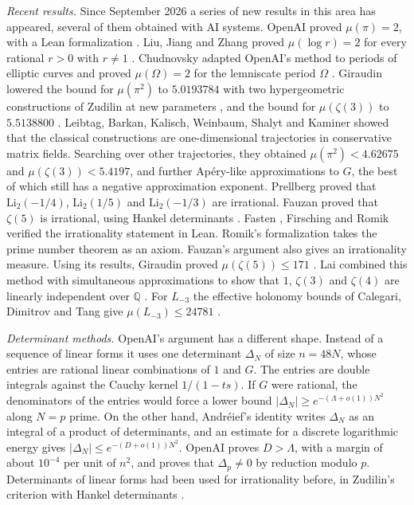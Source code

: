 \documentclass[11pt]{amsart}
\theoremstyle{definition}
\theoremstyle{remark}
\numberwithin{equation}{section}
\newcommand{\Q}{\mathbb Q}
\begin{document}
\emph{Recent results.} Since September 2026 a series of new results in this area has appeared, several of
them obtained with AI systems. OpenAI proved $\mu(\pi)=2$, with a Lean formalization \cite{OpenAIPi2026}.
Liu, Jiang and Zhang proved $\mu(\log r)=2$ for every rational $r>0$ with $r\ne1$ \cite{LiuJiangZhang26}.
Chudnovsky adapted OpenAI's method to periods of elliptic curves and proved $\mu(\Omega)=2$ for the lemniscate period
$\Omega$ \cite{Chudnovsky26}.
Giraudin lowered the bound for $\mu(\pi^2)$ to $5.0193784$ with two hypergeometric constructions of Zudilin
\cite{Zudilin14} at new parameters \cite{Giraudin26}, and the bound for $\mu(\zeta(3))$ to $5.5138800$
\cite{Giraudin26z3}. Leibtag, Barkan, Kalisch, Weinbaum, Shalyt and Kaminer \cite{LBKWSK26} showed that the
classical constructions are one-dimensional trajectories in conservative matrix fields. Searching over other
trajectories, they obtained $\mu(\pi^2)<4.62675$ and $\mu(\zeta(3))<5.4197$, and further Ap\'ery-like
approximations to $G$, the best of which still has a negative approximation exponent. Prellberg
\cite{Prellberg26} proved that $\mathrm{Li}_2(-1/4)$, $\mathrm{Li}_2(1/5)$ and $\mathrm{Li}_2(-1/3)$ are
irrational. Fauzan proved that $\zeta(5)$ is irrational, using Hankel determinants \cite{Fauzan2026}. Fasten \cite{Fasten26}, Firsching \cite{Firsching26} and Romik \cite{Romik26} verified the
irrationality statement in Lean. Romik's formalization takes the prime number theorem as an axiom. Fauzan's argument also gives an irrationality measure. Using its results,
Giraudin proved $\mu(\zeta(5))\le171$ \cite{Giraudin26z5}. Lai combined this method with simultaneous approximations to show that $1$, $\zeta(3)$ and
$\zeta(4)$ are linearly independent over $\Q$ \cite{Lai2026}. For $L_{-3}$ the effective holonomy
bounds of Calegari, Dimitrov and Tang give $\mu(L_{-3})\le24781$ \cite[Thm.~5.1]{CDT2025}.

\emph{Determinant methods.} OpenAI's argument \cite{OpenAI2026} has a different shape. Instead of a
sequence of linear forms it uses one determinant $\Delta_N$ of size $n=48N$, whose entries are rational
linear combinations of $1$ and $G$. The entries are double integrals against the Cauchy kernel
$1/(1-ts)$. If $G$ were rational, the denominators of the entries would force a lower bound
$|\Delta_N|\ge e^{-(\Lambda+o(1))N^2}$ along $N=p$ prime. On the other hand, Andr\'eief's identity
\cite{Forrester2018Andreief} writes $\Delta_N$ as an integral of a product of determinants, and an estimate
for a discrete logarithmic energy gives $|\Delta_N|\le e^{-(D+o(1))N^2}$. OpenAI proves $D>\Lambda$, with a
margin of about $10^{-4}$ per unit of $n^2$, and proves that $\Delta_p\ne0$ by reduction modulo $p$.
Determinants of linear forms had been used for irrationality before, in Zudilin's criterion with Hankel
determinants \cite{Zudilin}.
\end{document}
